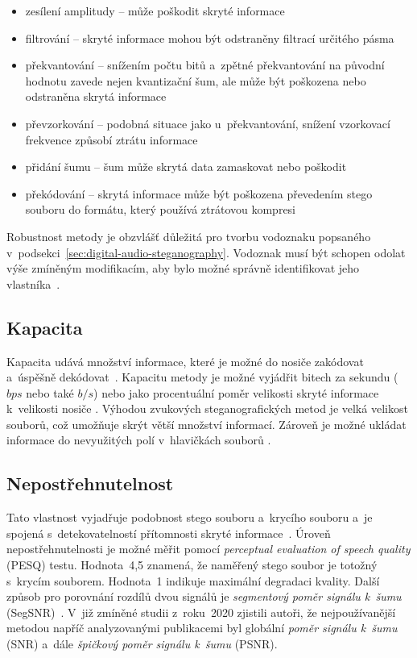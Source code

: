 \begin{itemize}
    \item zesílení amplitudy -- může poškodit skryté informace
    \item filtrování -- skryté informace mohou být odstraněny filtrací určitého
        pásma
    \item překvantování -- snížením počtu bitů a~zpětné překvantování na
        původní hodnotu zavede nejen kvantizační šum, ale může být poškozena
        nebo odstraněna skrytá informace
    \item převzorkování -- podobná situace jako u~překvantování, snížení
        vzorkovací frekvence způsobí ztrátu informace
    \item přidání šumu -- šum může skrytá data zamaskovat nebo poškodit
    \item překódování -- skrytá informace může být poškozena převedením stego
        souboru do formátu, který používá ztrátovou kompresi
\end{itemize}

Robustnost metody je obzvlášť důležitá pro tvorbu vodoznaku popsaného
v~podsekci~\ref{sec:digital-audio-steganography}. Vodoznak musí být schopen
odolat výše zmíněným modifikacím, aby bylo možné správně identifikovat jeho
vlastníka~\cite{Swanson1998}.

\subsection*{Kapacita}
\label{sub:capacity}

Kapacita udává množství informace, které je možné do nosiče zakódovat a~úspěšně
dekódovat~\cite{Dutta2020}\cite{Djebbar2012}. Kapacitu metody je možné vyjádřit
bitech za sekundu ($bps$ nebo také $b/s$) nebo jako procentuální poměr
velikosti skryté informace k~velikosti nosiče
\cite{AlSabhany2020}\cite{Dutta2020}. Výhodou zvukových steganografických metod
je velká velikost souborů, což umožňuje skrýt větší množství informací. Zároveň
je možné ukládat informace do nevyužitých polí v~hlavičkách souborů
\cite{Dutta2020}.

\subsection*{Nepostřehnutelnost}
\label{sub:imperceptibility}

Tato vlastnost vyjadřuje podobnost stego souboru a~krycího souboru a~je spojená
s~detekovatelností přítomnosti skryté informace~\cite{AlSabhany2020}. Úroveň
nepostřehnutelnosti je možné měřit pomocí \textit{perceptual evaluation of
speech quality} (PESQ) testu. Hodnota~4,5 znamená, že naměřený stego soubor je
totožný s~krycím souborem. Hodnota~1 indikuje maximální degradaci kvality.
Další způsob pro porovnání rozdílů dvou signálů je \textit{segmentový poměr
signálu k~šumu} (SegSNR)~\cite{Djebbar2012}. V~již zmíněné studii z~roku~2020
\cite{AlSabhany2020} zjistili autoři, že nejpoužívanější metodou napříč
analyzovanými publikacemi byl globální \textit{poměr signálu k~šumu} (SNR)
a~dále \textit{špičkový poměr signálu k~šumu} (PSNR).

